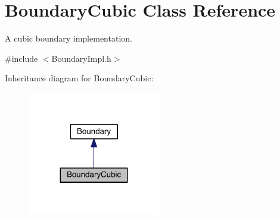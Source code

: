\hypertarget{classBoundaryCubic}{\section{Boundary\+Cubic Class Reference}
\label{classBoundaryCubic}
}


A cubic boundary implementation.  




{\ttfamily \#include $<$Boundary\+Impl.\+h$>$}



Inheritance diagram for Boundary\+Cubic\+:
\nopagebreak
\begin{figure}[H]
\begin{center}
\leavevmode
\includegraphics[width=164pt]{classBoundaryCubic__inherit__graph}
\end{center}
\end{figure}


